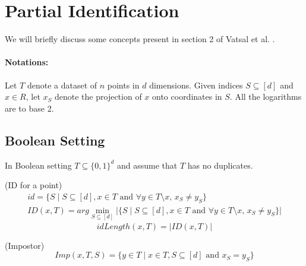 \section{Partial Identification}
\label{sec:partial-identification}

We will briefly discuss some concepts present in section 2 of Vatsal et al. \cite{NIPS2019_9710}. 

\paragraph{Notations:} Let $T$ denote a dataset of $n$ points in $d$ dimensions.
Given indices $S \subseteq [d]$ and $x \in R$, let $x_S$ denote the projection of $x$ onto coordinates in $S$.
All the logarithms are to base 2.

\subsection{Boolean Setting}
\label{subsec:boolean-setting}

In Boolean setting $T \subseteq \{0,1\}^d$ and assume that $T$ has no duplicates. 

\begin{defn}
    \label{defn:id-for-a-point}
    (ID for a point)
    \vspace{-1em}
    \begin{equation}
        \label{eq:ID}
        \begin{split}
        id = \{ S \mid S \subseteq [d], x \in T \textrm{ and } \forall y \in T \setminus x, \, x_S \neq y_S \}  \\
        ID(x,T) = arg \min_{S \subseteq [d]} \vert \{ S \mid S \subseteq [d], x \in T \textrm{ and } \forall y \in T \setminus x, \, x_S \neq y_S \} \vert
        \end{split}
    \end{equation}
    \vspace{-2em}
    \begin{equation}
        \label{eq:id-length}
        idLength(x,T) = \vert ID(x, T) \vert
    \end{equation}
\end{defn}

\begin{defn}
    \label{defn:impostor}
    (Impostor)
    \vspace{-1em}
    \begin{equation}
        \label{eq:impostor}
        Imp(x, T, S) = \{y \in T \mid x \in T, S \subseteq [d] \textrm{ and } x_S = y_S\}
    \end{equation}
\end{defn}


